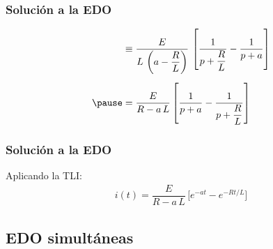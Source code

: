 \begin{frame}
\frametitle{Solución a la EDO}
\begin{eqnarray*}
\begin{aligned}
&\equiv \dfrac{E}{L \, \left(a - \dfrac{R}{L} \right)} \, \left[ \dfrac{1}{p + \dfrac{R}{L}}  - \dfrac{1}{p + a}\right] \\[0.5em] \pause
&= \dfrac{E}{R - a \, L} \left[ \dfrac{1}{p + a} - \dfrac{1}{p + \dfrac{R}{L}}\right]
\end{aligned}
\end{eqnarray*}
\end{frame}
\begin{frame}
\frametitle{Solución a la EDO}
Aplicando la TLI:
\begin{align*}
i (t) = \dfrac{E}{R - a \, L} \, \big[  e^{-a t} - e^{-R t /L} \big]
\end{align*}
\end{frame}

\subsection{EDO simultáneas}

